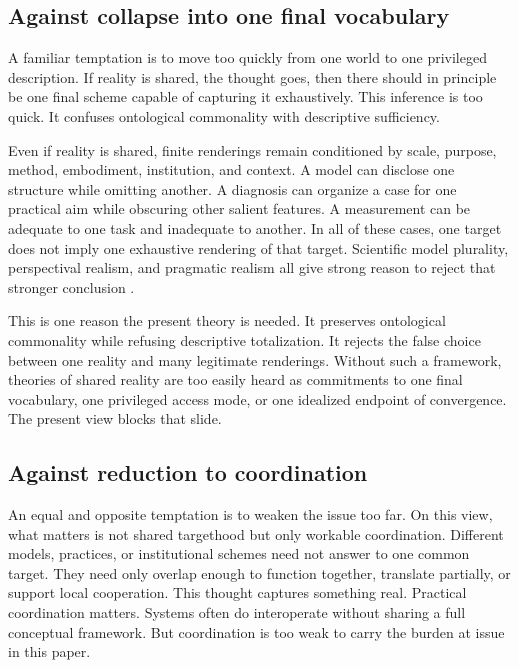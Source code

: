 \documentclass[11pt]{article}
\begin{document}
\subsection{Against collapse into one final vocabulary}

A familiar temptation is to move too quickly from one world to one privileged description. If reality is shared, the thought goes, then there should in principle be one final scheme capable of capturing it exhaustively. This inference is too quick. It confuses ontological commonality with descriptive sufficiency.

Even if reality is shared, finite renderings remain conditioned by scale, purpose, method, embodiment, institution, and context. A model can disclose one structure while omitting another. A diagnosis can organize a case for one practical aim while obscuring other salient features. A measurement can be adequate to one task and inadequate to another. In all of these cases, one target does not imply one exhaustive rendering of that target. Scientific model plurality, perspectival realism, and pragmatic realism all give strong reason to reject that stronger conclusion \cite{Giere2006ScientificPerspectivism,Massimi2022PerspectivalRealism,Chang2022RealismForRealisticPeople}.

This is one reason the present theory is needed. It preserves ontological commonality while refusing descriptive totalization. It rejects the false choice between one reality and many legitimate renderings. Without such a framework, theories of shared reality are too easily heard as commitments to one final vocabulary, one privileged access mode, or one idealized endpoint of convergence. The present view blocks that slide.

\subsection{Against reduction to coordination}

An equal and opposite temptation is to weaken the issue too far. On this view, what matters is not shared targethood but only workable coordination. Different models, practices, or institutional schemes need not answer to one common target. They need only overlap enough to function together, translate partially, or support local cooperation. This thought captures something real. Practical coordination matters. Systems often do interoperate without sharing a full conceptual framework. But coordination is too weak to carry the burden at issue in this paper.
\end{document}
